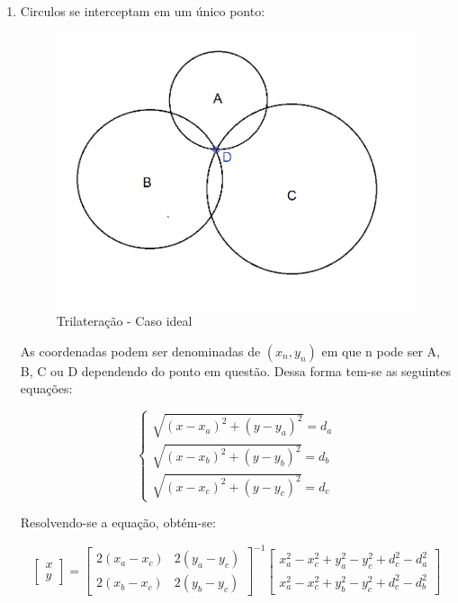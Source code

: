 \begin{enumerate}

	\item Circulos se interceptam em um único ponto:

	\begin{figure}[H]
		\centering
		\includegraphics[scale = 0.8]{images/trilateration1.png}
		\caption{Trilateração - Caso ideal}
		\label{fig:trilateration.png}
	\end{figure}


	As coordenadas podem ser denominadas de \( (x_n, y_n) \) em que n pode ser A, B, C ou D dependendo do ponto em questão. Dessa forma tem-se as seguintes equações:

	\begin{equation*}
	\begin{cases} \sqrt{(x - x_a)^2 + (y - y_a)^2} = d_a \\ \sqrt{(x - x_b)^2 + (y - y_b)^2} = d_b \\ \sqrt{(x - x_c)^2 + (y - y_c)^2} = d_c \end{cases}
	\end{equation*}

	Resolvendo-se a equação, obtém-se:

	\begin{equation*}
	\begin{bmatrix}
		x \\
		y
	\end{bmatrix} =
	\begin{bmatrix}
		2(x_a - x_c) & 2(y_a - y_c) \\
		2(x_b - x_c) & 2(y_b - y_c)
	\end{bmatrix}^{-1}
	\begin{bmatrix}
		x_a^2 - x_c^2 + y_a^2 - y_c^2 + d_c^2 - d_a^2 \\
		x_a^2 - x_c^2 + y_b^2 - y_c^2 + d_c^2 - d_b^2
	\end{bmatrix}
	\end{equation*}



\end{enumerate}
